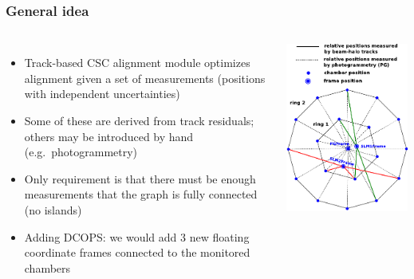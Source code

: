 \documentclass[compress]{beamer}
\begin{document}
\begin{frame}
\frametitle{General idea}
\begin{columns}
\begin{itemize}
\item Track-based CSC alignment module optimizes alignment given a set of measurements (positions with independent uncertainties)
\item Some of these are derived from track residuals; others may be introduced by hand (e.g.\ photogrammetry)
\item Only requirement is that there must be enough measurements that the graph is fully connected (no islands)
\item Adding DCOPS: we would add 3 new floating coordinate frames connected to the monitored chambers
\end{itemize}

\includegraphics[width=\linewidth]{beamhalo-PG-SLM.pdf}
\end{columns}
\end{frame}
\end{document}
